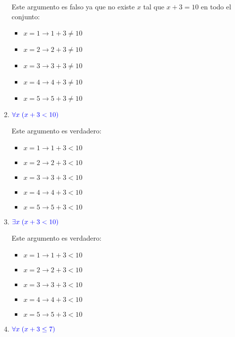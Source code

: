 \documentclass[12pt]{article}
\newcommand{\db}[1]{\textcolor{blue}{#1}}
\begin{document}
\begin{enumerate}[label=\color{red}\textbf{\arabic*)}, leftmargin=*]
\begin{enumerate}[label=\color{red}\alph*)]
            Este argumento es falso ya que no existe $x$ tal que $x+3=10$ en todo el conjunto:
            \begin{itemize}[label=$-$]
                  \item $x=1\longrightarrow 1+3\neq10$
                  \item $x=2\longrightarrow 2+3\neq10$
                  \item $x=3\longrightarrow 3+3\neq10$
                  \item $x=4\longrightarrow 4+3\neq10$
                  \item $x=5\longrightarrow 5+3\neq10$
            \end{itemize}
            \item $\db{\forall x\;(x+3<10)}$
            
            Este argumento es verdadero:
            \begin{itemize}[label=$-$]
                  \item $x=1\longrightarrow 1+3<10$
                  \item $x=2\longrightarrow 2+3<10$
                  \item $x=3\longrightarrow 3+3<10$
                  \item $x=4\longrightarrow 4+3<10$
                  \item $x=5\longrightarrow 5+3<10$
            \end{itemize}
            \item $\db{\exists x\;(x+3<10)}$
            
            Este argumento es verdadero:
            \begin{itemize}[label=$-$]
                  \item $x=1\longrightarrow 1+3<10$
                  \item $x=2\longrightarrow 2+3<10$
                  \item $x=3\longrightarrow 3+3<10$
                  \item $x=4\longrightarrow 4+3<10$
                  \item $x=5\longrightarrow 5+3<10$
            \end{itemize}
            \item $\db{\forall x\;(x+3\le7)}$
            

\end{enumerate}
\end{enumerate}
\end{document}
